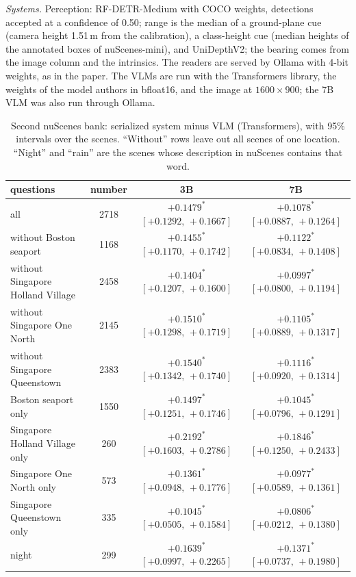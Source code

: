 \documentclass[10pt]{article}
\renewcommand{\thetable}{S\arabic{table}}
\newcommand{\settab}[1]{\setcounter{table}{#1}\addtocounter{table}{-1}\renewcommand{\thetable}{S\arabic{table}}}
\begin{document}
\emph{Systems.} Perception: RF-DETR-Medium with COCO weights, detections accepted at a confidence of 0.50; range is the median of a ground-plane cue (camera height 1.51\,m from the calibration), a class-height cue (median heights of the annotated boxes of nuScenes-mini), and UniDepthV2; the bearing comes from the image column and the intrinsics. The readers are served by Ollama with 4-bit weights, as in the paper. The VLMs are run with the Transformers library, the weights of the model authors in bfloat16, and the image at $1600{\times}900$; the 7B VLM was also run through Ollama.

\settab{14}\begin{table}[h]\centering\footnotesize
\caption{Second nuScenes bank: serialized system minus VLM (Transformers), with 95\% intervals over the scenes. ``Without'' rows leave out all scenes of one location. ``Night'' and ``rain'' are the scenes whose description in nuScenes contains that word.}\label{tab:s14}
\begin{tabular}{@{}lccc@{}}
\toprule questions & number & 3B & 7B \\ \midrule
all & 2718 & $+0.1479^{*}$ $[+0.1292,\,+0.1667]$ & $+0.1078^{*}$ $[+0.0887,\,+0.1264]$ \\ \midrule
without Boston seaport & 1168 & $+0.1455^{*}$ $[+0.1170,\,+0.1742]$ & $+0.1122^{*}$ $[+0.0834,\,+0.1408]$ \\
without Singapore Holland Village & 2458 & $+0.1404^{*}$ $[+0.1207,\,+0.1600]$ & $+0.0997^{*}$ $[+0.0800,\,+0.1194]$ \\
without Singapore One North & 2145 & $+0.1510^{*}$ $[+0.1298,\,+0.1719]$ & $+0.1105^{*}$ $[+0.0889,\,+0.1317]$ \\
without Singapore Queenstown & 2383 & $+0.1540^{*}$ $[+0.1342,\,+0.1740]$ & $+0.1116^{*}$ $[+0.0920,\,+0.1314]$ \\ \midrule
Boston seaport only & 1550 & $+0.1497^{*}$ $[+0.1251,\,+0.1746]$ & $+0.1045^{*}$ $[+0.0796,\,+0.1291]$ \\
Singapore Holland Village only & 260 & $+0.2192^{*}$ $[+0.1603,\,+0.2786]$ & $+0.1846^{*}$ $[+0.1250,\,+0.2433]$ \\
Singapore One North only & 573 & $+0.1361^{*}$ $[+0.0948,\,+0.1776]$ & $+0.0977^{*}$ $[+0.0589,\,+0.1361]$ \\
Singapore Queenstown only & 335 & $+0.1045^{*}$ $[+0.0505,\,+0.1584]$ & $+0.0806^{*}$ $[+0.0212,\,+0.1380]$ \\ \midrule
night & 299 & $+0.1639^{*}$ $[+0.0997,\,+0.2265]$ & $+0.1371^{*}$ $[+0.0737,\,+0.1980]$ \\

\end{tabular}
\end{table}
\end{document}
